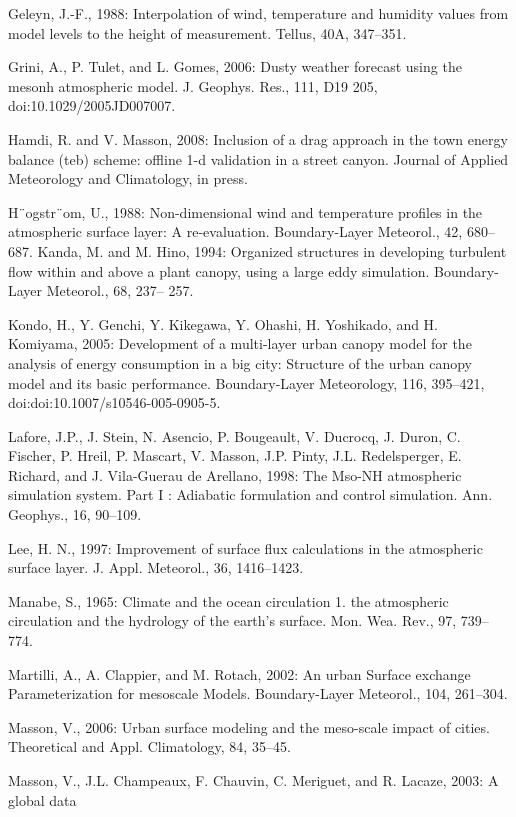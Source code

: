 \begin{description}
\item
Geleyn, J.-F., 1988: Interpolation of wind, temperature and humidity values from model levels
to the height of measurement. Tellus, 40A, 347–351.
\item
Grini, A., P. Tulet, and L. Gomes, 2006: Dusty weather forecast using the mesonh atmospheric
model. J. Geophys. Res., 111, D19 205, doi:10.1029/2005JD007007.
\item
Hamdi, R. and V. Masson, 2008: Inclusion of a drag approach in the town energy balance
(teb) scheme: offline 1-d validation in a street canyon. Journal of Applied Meteorology and
Climatology, in press.
\item
H¨ogstr¨om, U., 1988: Non-dimensional wind and temperature profiles in the atmospheric surface
layer: A re-evaluation. Boundary-Layer Meteorol., 42, 680–687.
Kanda, M. and M. Hino, 1994: Organized structures in developing turbulent flow within and
above a plant canopy, using a large eddy simulation. Boundary-Layer Meteorol., 68, 237–
257.
\item
Kondo, H., Y. Genchi, Y. Kikegawa, Y. Ohashi, H. Yoshikado, and H. Komiyama, 2005: Development
of a multi-layer urban canopy model for the analysis of energy consumption in
a big city: Structure of the urban canopy model and its basic performance. Boundary-Layer
Meteorology, 116, 395–421, doi:doi:10.1007/s10546-005-0905-5.
\item
Lafore, J.P., J. Stein, N. Asencio, P. Bougeault, V. Ducrocq, J. Duron, C. Fischer, P. Hreil,
P. Mascart, V. Masson, J.P. Pinty, J.L. Redelsperger, E. Richard, and J. Vila-Guerau de Arellano,
1998: The Mso-NH atmospheric simulation system. Part I : Adiabatic formulation and
control simulation. Ann. Geophys., 16, 90–109.
\item
Lee, H. N., 1997: Improvement of surface flux calculations in the atmospheric surface layer. J.
Appl. Meteorol., 36, 1416–1423.
\item
Manabe, S., 1965: Climate and the ocean circulation 1. the atmospheric circulation and the
hydrology of the earth’s surface. Mon. Wea. Rev., 97, 739–774.
\item
Martilli, A., A. Clappier, and M. Rotach, 2002: An urban Surface exchange Parameterization
for mesoscale Models. Boundary-Layer Meteorol., 104, 261–304.
\item
Masson, V., 2006: Urban surface modeling and the meso-scale impact of cities. Theoretical and
Appl. Climatology, 84, 35–45.
\item
Masson, V., J.L. Champeaux, F. Chauvin, C. Meriguet, and R. Lacaze, 2003: A global data

\end{description}
